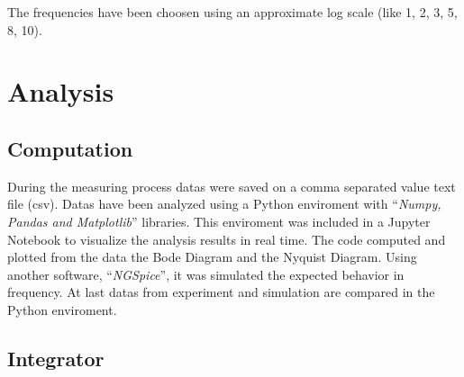 \documentclass[a4paper, twocolumn]{article}
\begin{document}
The frequencies have been choosen using an approximate log scale (like 1, 2, 3, 5, 8, 10). 

\section{Analysis}

\subsection{Computation}

During the measuring process datas were saved on a comma separated value text file (csv). Datas have been analyzed using a Python enviroment with ``\emph{Numpy, Pandas and Matplotlib}'' libraries. This enviroment was included in a Jupyter Notebook to visualize the analysis results in real time. The code computed and plotted from the data the Bode Diagram and the Nyquist Diagram. Using another software, ``\emph{NGSpice}'', it was simulated the expected behavior in frequency. At last datas from experiment and simulation are compared in the Python enviroment.

\subsection{Integrator}
\end{document}
